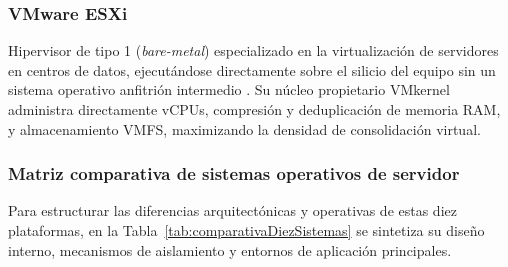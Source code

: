 \documentclass[12pt]{article}
\begin{document}
\subsubsection{VMware ESXi}
Hipervisor de tipo 1 (\textit{bare-metal}) especializado en la virtualización de servidores en centros de datos, ejecutándose directamente sobre el silicio del equipo sin un sistema operativo anfitrión intermedio \parencite{vmwareEsxi}. Su núcleo propietario VMkernel administra directamente vCPUs, compresión y deduplicación de memoria RAM, y almacenamiento VMFS, maximizando la densidad de consolidación virtual.

\subsubsection{Matriz comparativa de sistemas operativos de servidor}
Para estructurar las diferencias arquitectónicas y operativas de estas diez plataformas, en la Tabla~\ref{tab:comparativaDiezSistemas} se sintetiza su diseño interno, mecanismos de aislamiento y entornos de aplicación principales.
\end{document}
